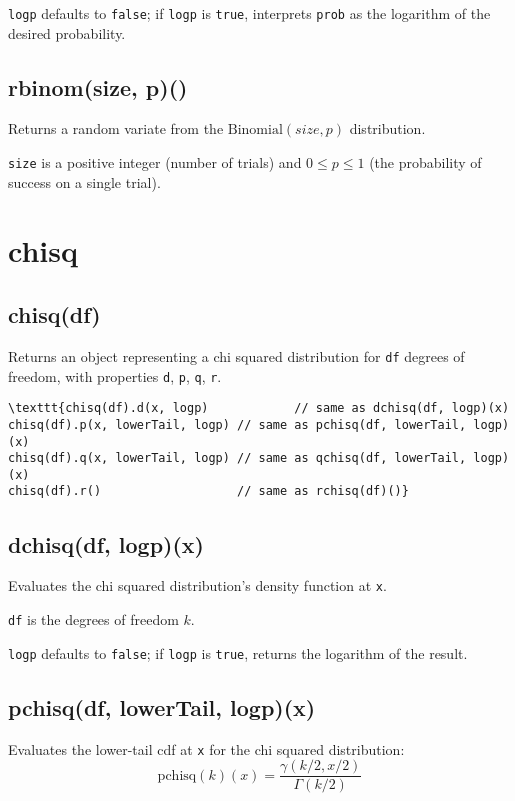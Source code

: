 \documentclass{article}
\begin{document}
\texttt{logp} defaults to \texttt{false}; if \texttt{logp} is \texttt{true}, interprets \texttt{prob} as
the logarithm of the desired probability.


    \subsection*{rbinom(size, p)()}
    Returns a random variate from the $\textrm{Binomial}(size, p)$ distribution.


\texttt{size} is a positive integer (number of trials) and $0 \leq p \leq 1$
(the probability of success on a single trial).


  \section{chisq}
    \subsection*{chisq(df)}
    Returns an object representing a chi squared distribution for \texttt{df} degrees
of freedom, with properties \texttt{d}, \texttt{p}, \texttt{q}, \texttt{r}.


\begin{lstlisting}
\texttt{chisq(df).d(x, logp)            // same as dchisq(df, logp)(x)
chisq(df).p(x, lowerTail, logp) // same as pchisq(df, lowerTail, logp)(x)
chisq(df).q(x, lowerTail, logp) // same as qchisq(df, lowerTail, logp)(x)
chisq(df).r()                   // same as rchisq(df)()}\end{lstlisting}

    \subsection*{dchisq(df, logp)(x)}
    Evaluates the chi squared distribution's density function at \texttt{x}.


\texttt{df} is the degrees of freedom $k$.


\texttt{logp} defaults to \texttt{false}; if \texttt{logp} is \texttt{true}, returns the
logarithm of the result.


    \subsection*{pchisq(df, lowerTail, logp)(x)}
    Evaluates the lower-tail cdf at \texttt{x} for the chi squared distribution:
$$\textrm{pchisq}(k)(x) = \frac{\gamma(k/2, x/2)}{\Gamma(k/2)}$$
\end{document}
